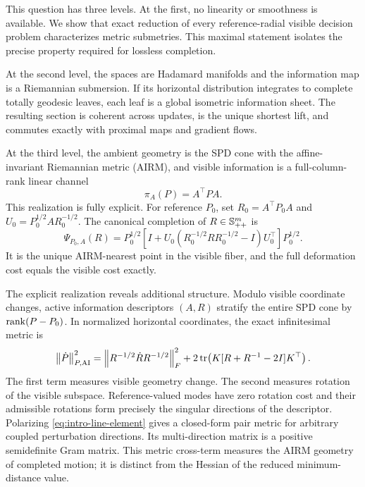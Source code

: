 This question has three levels.  At the first, no linearity or smoothness is
available.  We show that exact reduction of every reference-radial visible
decision problem characterizes metric submetries.  This maximal statement
isolates the precise property required for lossless completion.

At the second level, the spaces are Hadamard manifolds and the information map
is a Riemannian submersion.  If its horizontal distribution integrates to
complete totally geodesic leaves, each leaf is a global isometric information
sheet.  The resulting section is coherent across updates, is the unique
shortest lift, and commutes exactly with proximal maps and gradient flows.

At the third level, the ambient geometry is the SPD cone with the
affine-invariant Riemannian metric (AIRM), and visible information is a
full-column-rank linear channel
\[
  \pi_A(P)=A^\top P A.
\]
This realization is fully explicit.  For reference \(P_0\), set
\(R_0=A^\top P_0A\) and
\(U_0=P_0^{1/2}AR_0^{-1/2}\).  The canonical completion of
\(R\in\mathbb S_{++}^m\) is
\begin{equation}
  \Psi_{P_0,A}(R)
  =P_0^{1/2}
  \left[I+U_0(R_0^{-1/2}RR_0^{-1/2}-I)U_0^\top\right]
  P_0^{1/2}.
  \label{eq:intro-completion}
\end{equation}
It is the unique AIRM-nearest point in the visible fiber, and the full
deformation cost equals the visible cost exactly.

The explicit realization reveals additional structure.  Modulo visible
coordinate changes, active information descriptors \((A,R)\) stratify the
entire SPD cone by \(\operatorname{rank}(P-P_0)\).  In normalized horizontal coordinates,
the exact infinitesimal metric is
\begin{equation}
  \left\lVert \dot P\right\rVert_{P,\mathrm{AI}}^2
  =
  \left\lVert R^{-1/2}\dot R R^{-1/2}\right\rVert_F^2
  +2\operatorname{tr}\!\left(K[R+R^{-1}-2I]K^\top\right).
  \label{eq:intro-line-element}
\end{equation}
The first term measures visible geometry change.  The second measures rotation
of the visible subspace.  Reference-valued modes have zero rotation cost and
their admissible rotations form precisely the singular directions of the
descriptor.  Polarizing
\eqref{eq:intro-line-element} gives a closed-form pair metric for arbitrary
coupled perturbation directions.  Its multi-direction matrix is a positive
semidefinite Gram matrix.  This metric cross-term measures the AIRM geometry
of completed motion; it is distinct from the Hessian of the reduced
minimum-distance value.


